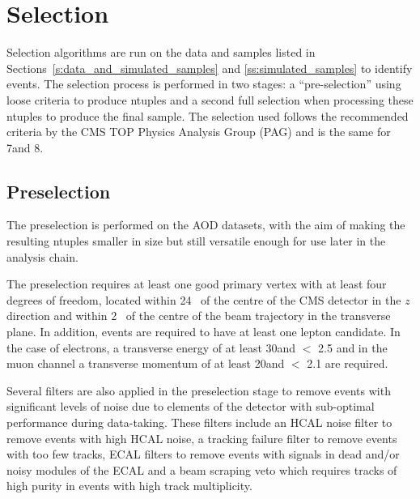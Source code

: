 \section{Selection}
\label{s:selection}
Selection algorithms are run on the data and samples listed in Sections~\ref{s:data_and_simulated_samples} and
\ref{ss:simulated_samples} to identify \ttbar events. The selection process is performed in two stages: a
``pre-selection'' using loose criteria to produce ntuples and a second full selection when processing these
ntuples to produce the final sample. The selection used follows the recommended criteria by
the CMS TOP Physics Analysis Group (PAG) and is the same for 7\TeV and 8\TeV.

\subsection{Preselection}
\label{ss:preselection}
The preselection is performed on the AOD datasets, with the aim of making the resulting ntuples smaller
in size but still versatile enough for use later in the analysis chain.

The preselection requires at least one good primary vertex with at least four degrees of freedom,
located within 24\cm~ of the centre of the CMS detector in the $z$ direction and within 2\cm~ of the centre of
the beam trajectory in the transverse plane. In addition, events are required to have at least one lepton
candidate. In the case of electrons, a transverse energy of at least 30\GeV and \abseta $<$ 2.5 and in the
muon channel a transverse momentum of at least 20\GeV and \abseta $<$ 2.1 are required. 

Several filters are also applied in the preselection stage to remove events with significant levels of noise
due to elements of the detector with sub-optimal performance during data-taking. These filters include an HCAL
noise filter to remove events with high HCAL noise, a tracking failure filter to remove events with too few
tracks, ECAL filters to remove events with signals in dead and/or noisy modules of the ECAL and a beam
scraping veto which requires tracks of high purity in events with high track multiplicity.

